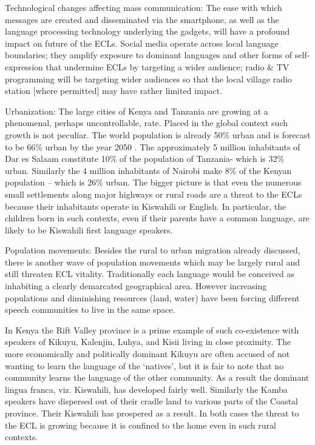 \documentclass[output=paper,colorlinks,citecolor=brown]{langscibook}
\begin{document}
Technological changes affecting mass communication: The ease with which messages are created and disseminated via the smartphone, as well as the language processing technology underlying the gadgets, will have a profound impact on future of the ECLs. Social media operate across local language boundaries; they amplify exposure to dominant languages and other forms of self-expression that undermine ECLs by targeting a wider audience; radio \& TV programming will be targeting wider  audiences so that the local village radio station [where permitted] may have rather limited impact.

Urbanization: The large cities of Kenya and Tanzania are growing at a phenomenal, perhaps uncontrollable, rate. Placed in the global context such growth is not peculiar. The world population is already 50\% urban and is forecast to be 66\% urban by the year 2050 \citep{URBANET2019}. The approximately 5 million inhabitants of Dar es Salaam constitute 10\% of the population of Tanzania- which is 32\% urban. Similarly the 4 million inhabitants of Nairobi make 8\% of the Kenyan population – which is 26\% urban. The bigger picture is that even the numerous small settlements along major highways or rural roads are a threat to the ECLs because their inhabitants operate in Kiswahili or English. In particular, the children born in such contexts, even if their parents have a common language, are likely to be Kiswahili first language speakers. 

Population movements: Besides the rural to urban migration already discussed, there is another wave of population movements which may be largely rural and still threaten ECL vitality. Traditionally each language would be conceived as inhabiting a clearly demarcated geographical area. However increasing populations and diminishing resources (land, water) have been forcing different speech communities to live in the same space. 

In Kenya the Rift Valley province is a prime example of such co-existence with speakers of Kikuyu, Kalenjin, Luhya, and Kisii living in close proximity.  The more economically and politically dominant Kikuyu are often accused of not wanting to learn the language of the ‘natives’, but it is fair to note that no community learns the language of the other community. As a result the dominant lingua franca, viz. Kiswahili, has developed fairly well. Similarly the Kamba speakers have dispersed out of their cradle land to various parts of the Coastal province. Their Kiswahili has prospered as a result. In both cases the threat to the ECL is growing because it is confined to the home even in such rural contexts. 
\end{document}

